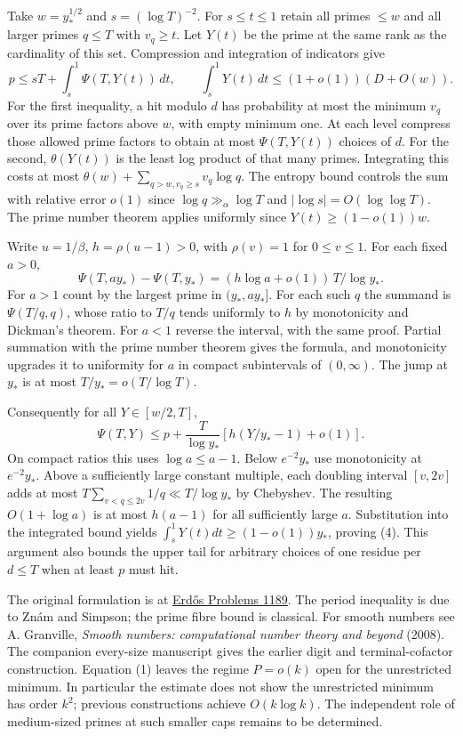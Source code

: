 \documentclass[11pt]{article}
\newcommand{\head}[1]{\par\vspace{5pt}{\large\bfseries #1}\par}
\begin{document}
\newpage
\head{Arithmetic estimates for the entropy bound}
Take $w=y_*^{1/2}$ and $s=(\log T)^{-2}$. For $s\le t\le1$ retain all primes $\le w$ and all larger primes $q\le T$ with $v_q\ge t$. Let $Y(t)$ be the prime at the same rank as the cardinality of this set. Compression and integration of indicators give
\[
 p\le sT+\int_s^1\Psi(T,Y(t))\,dt,\qquad
 \int_s^1Y(t)\,dt\le(1+o(1))(D+O(w)).
\]
For the first inequality, a hit modulo $d$ has probability at most the minimum $v_q$ over its prime factors above $w$, with empty minimum one. At each level compress those allowed prime factors to obtain at most $\Psi(T,Y(t))$ choices of $d$. For the second, $\theta(Y(t))$ is the least log product of that many primes. Integrating this costs at most $\theta(w)+\sum_{q>w,v_q\ge s}v_q\log q$. The entropy bound controls the sum with relative error $o(1)$ since $\log q\gg_\alpha\log T$ and $|\log s|=O(\log\log T)$. The prime number theorem applies uniformly since $Y(t)\ge(1-o(1))w$.

Write $u=1/\beta$, $h=\rho(u-1)>0$, with $\rho(v)=1$ for $0\le v\le1$. For each fixed $a>0$,
\[
 \Psi(T,ay_*)-\Psi(T,y_*)=(h\log a+o(1))\,T/\log y_*.
\]
For $a>1$ count by the largest prime in $(y_*,ay_*]$. For each such $q$ the summand is $\Psi(T/q,q)$, whose ratio to $T/q$ tends uniformly to $h$ by monotonicity and Dickman's theorem. For $a<1$ reverse the interval, with the same proof. Partial summation with the prime number theorem gives the formula, and monotonicity upgrades it to uniformity for $a$ in compact subintervals of $(0,\infty)$. The jump at $y_*$ is at most $T/y_*=o(T/\log T)$.

Consequently for all $Y\in[w/2,T]$,
\[
 \Psi(T,Y)\le p+\frac{T}{\log y_*}\left[h(Y/y_*-1)+o(1)\right].
\]
On compact ratios this uses $\log a\le a-1$. Below $e^{-2}y_*$ use monotonicity at $e^{-2}y_*$. Above a sufficiently large constant multiple, each doubling interval $[v,2v]$ adds at most $T\sum_{v<q\le2v}1/q\ll T/\log y_*$ by Chebyshev. The resulting $O(1+\log a)$ is at most $h(a-1)$ for all sufficiently large $a$. Substitution into the integrated bound yields $\int_s^1Y(t)dt\ge(1-o(1))y_*$, proving (4). This argument also bounds the upper tail for arbitrary choices of one residue per $d\le T$ when at least $p$ must hit.

\head{Sources and remaining question}
The original formulation is at \href{https://www.erdosproblems.com/1189}{Erd\H os Problems 1189}. The period inequality is due to Zn\'am and Simpson; the prime fibre bound is classical. For smooth numbers see A. Granville, \emph{Smooth numbers: computational number theory and beyond} (2008). The companion every-size manuscript gives the earlier digit and terminal-cofactor construction. Equation (1) leaves the regime $P=o(k)$ open for the unrestricted minimum. In particular the estimate does not show the unrestricted minimum has order $k^2$; previous constructions achieve $O(k\log k)$. The independent role of medium-sized primes at such smaller caps remains to be determined.




\end{document}
